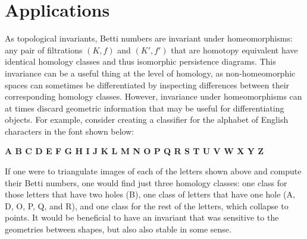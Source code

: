 \documentclass[10pt]{article}
\numberwithin{equation}{section}
\newcommand{\+}{%
	\raisebox{0.18ex}{\scaleobj{0.55}{+}}
}
\theoremstyle{definition}
\begin{document}
\newpage

\newpage

\section{Applications}\label{sec:applications}





%
As topological invariants, Betti numbers are invariant under homeomorphisms: any pair of filtrations $(K, f)$ and $(K', f')$ that are homotopy equivalent have identical homology classes and thus isomorphic persistence diagrams. 
This invariance can be a useful thing at the level of homology, as non-homeomorphic spaces can sometimes be differentiated by inspecting differences between their corresponding homology classes. 
However, invariance under homeomorphisms can at times discard geometric information that may be useful for differentiating objects.
For example, consider creating a classifier for the alphabet of English characters in the font shown below:
\vspace{0.5em}
\\
\vspace{0.5em}
\begin{ttfamily}
	\selectfont \bfseries
	\hfill A B C D E F G H I J K L M N O P Q R S T U V W X Y Z \hfill 
\end{ttfamily}

\noindent If one were to triangulate images of each of the letters shown above and compute their Betti numbers, one would find just three homology classes: one class for those letters that have two holes (B), one class of letters that have one hole (A, D, O, P, Q, and R), and one class for the rest of the letters, which collapse to points. It would be beneficial to have an invariant that was sensitive to the geometries between shapes, but also also stable in some sense.
\end{document}
